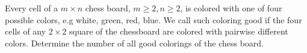 Every cell of a $m \times n$ chess board, $m\ge 2,n\ge 2$, is colored with one of four possible colors, e.g white, green, red, blue. We call such coloring good if the four cells of any $2\times 2$ square of the chessboard are colored with pairwise different colors. Determine the number of all good colorings of the chess board.


